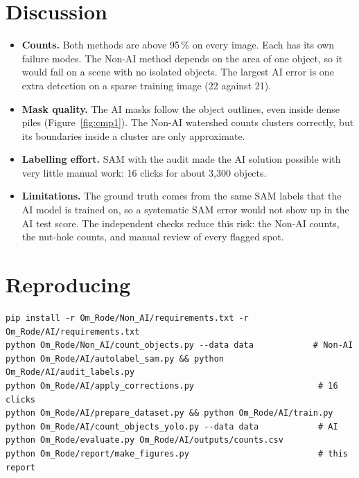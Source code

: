 \documentclass[10pt,a4paper]{article}
\begin{document}
\section{Discussion}
\begin{itemize}\setlength{\itemsep}{0.2em}
  \item \textbf{Counts.} Both methods are above 95\,\% on every image. Each has its own failure modes. The Non-AI method depends on the area of one object, so it would fail on a scene with no isolated objects. The largest AI error is one extra detection on a sparse training image (22 against 21).
  \item \textbf{Mask quality.} The AI masks follow the object outlines, even inside dense piles (Figure~\ref{fig:cmp1}). The Non-AI watershed counts clusters correctly, but its boundaries inside a cluster are only approximate.
  \item \textbf{Labelling effort.} SAM with the audit made the AI solution possible with very little manual work: 16 clicks for about 3{,}300 objects.
  \item \textbf{Limitations.} The ground truth comes from the same SAM labels that the AI model is trained on, so a systematic SAM error would not show up in the AI test score. The independent checks reduce this risk: the Non-AI counts, the nut-hole counts, and manual review of every flagged spot.
\end{itemize}

\section{Reproducing}
{\footnotesize
\begin{verbatim}
pip install -r Om_Rode/Non_AI/requirements.txt -r Om_Rode/AI/requirements.txt
python Om_Rode/Non_AI/count_objects.py --data data            # Non-AI
python Om_Rode/AI/autolabel_sam.py && python Om_Rode/AI/audit_labels.py
python Om_Rode/AI/apply_corrections.py                         # 16 clicks
python Om_Rode/AI/prepare_dataset.py && python Om_Rode/AI/train.py
python Om_Rode/AI/count_objects_yolo.py --data data            # AI
python Om_Rode/evaluate.py Om_Rode/AI/outputs/counts.csv
python Om_Rode/report/make_figures.py                          # this report
\end{verbatim}
}
\end{document}
